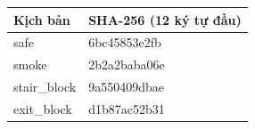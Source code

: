 \begin{center}\small
\begin{tabular}{ll}
\toprule
Kịch bản & SHA-256 (12 ký tự đầu)\\\midrule
safe & 6bc45853e2fb\\
smoke & 2b2a2baba06e\\
stair\_block & 9a550409dbae\\
exit\_block & d1b87ac52b31\\
\bottomrule\end{tabular}\end{center}